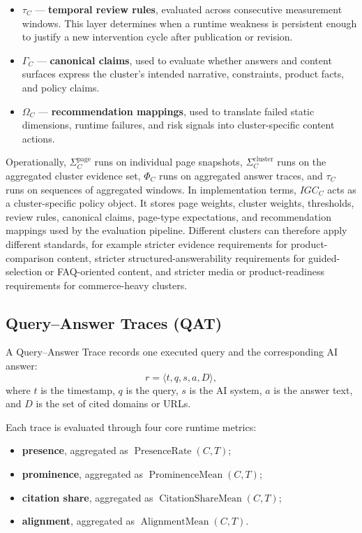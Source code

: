 \documentclass{article}
\begin{document}
\begin{itemize}
    \item \(\tau_C\) --- \textbf{temporal review rules}, evaluated across consecutive measurement windows. This layer determines when a runtime weakness is persistent enough to justify a new intervention cycle after publication or revision.

    \item \(\Gamma_C\) --- \textbf{canonical claims}, used to evaluate whether answers and content surfaces express the cluster's intended narrative, constraints, product facts, and policy claims.

    \item \(\Omega_C\) --- \textbf{recommendation mappings}, used to translate failed static dimensions, runtime failures, and risk signals into cluster-specific content actions.
\end{itemize}

Operationally, \(\Sigma_C^{\text{page}}\) runs on individual page snapshots, \(\Sigma_C^{\text{cluster}}\) runs on the aggregated cluster evidence set, \(\Phi_C\) runs on aggregated answer traces, and \(\tau_C\) runs on sequences of aggregated windows. In implementation terms, \(IGC_C\) acts as a cluster-specific policy object. It stores page weights, cluster weights, thresholds, review rules, canonical claims, page-type expectations, and recommendation mappings used by the evaluation pipeline. Different clusters can therefore apply different standards, for example stricter evidence requirements for product-comparison content, stricter structured-answerability requirements for guided-selection or FAQ-oriented content, and stricter media or product-readiness requirements for commerce-heavy clusters.

\subsection{Query--Answer Traces (QAT)}

A Query--Answer Trace records one executed query and the corresponding AI answer:
\[
r = \langle t, q, s, a, D \rangle,
\]
where \(t\) is the timestamp, \(q\) is the query, \(s\) is the AI system, \(a\) is the answer text, and \(D\) is the set of cited domains or URLs.

Each trace is evaluated through four core runtime metrics:
\begin{itemize}
    \item \textbf{presence}, aggregated as \(\operatorname{PresenceRate}(C,T)\);
    \item \textbf{prominence}, aggregated as \(\operatorname{ProminenceMean}(C,T)\);
    \item \textbf{citation share}, aggregated as \(\operatorname{CitationShareMean}(C,T)\);
    \item \textbf{alignment}, aggregated as \(\operatorname{AlignmentMean}(C,T)\).
\end{itemize}
\end{document}
